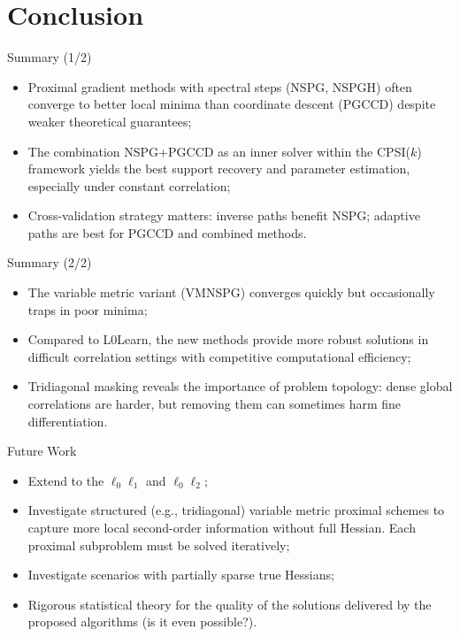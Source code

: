 \section{Conclusion}
\begin{frame}{Summary (1/2)}
\begin{itemize}
\item Proximal gradient methods with spectral steps (NSPG, NSPGH) often converge to better local minima than coordinate descent (PGCCD) despite weaker theoretical guarantees;
\item The combination NSPG+PGCCD as an inner solver within the CPSI($k$) framework yields the best support recovery and parameter estimation, especially under constant correlation;
\item Cross-validation strategy matters: inverse paths benefit NSPG; adaptive paths are best for PGCCD and combined methods.
\end{itemize}
\end{frame}

\begin{frame}{Summary (2/2)}
\begin{itemize}
\item The variable metric variant (VMNSPG) converges quickly but occasionally traps in poor minima;
\item Compared to L0Learn, the new methods provide more robust solutions in difficult correlation settings with competitive computational efficiency;
\item Tridiagonal masking reveals the importance of problem topology: dense global correlations are harder, but removing them can sometimes harm fine differentiation.
\end{itemize}
\end{frame}

\begin{frame}{Future Work}
\begin{itemize}
\item Extend to the $\ell_0\ell_1$ and $\ell_0\ell_2$;
\item Investigate structured (e.g., tridiagonal) variable metric proximal schemes to capture more local second-order information without full Hessian. Each proximal subproblem must be solved iteratively;
\item Investigate scenarios with partially sparse true Hessians;
\item Rigorous statistical theory for the quality of the solutions delivered by the proposed algorithms (is it even possible?).
\end{itemize}
\end{frame}